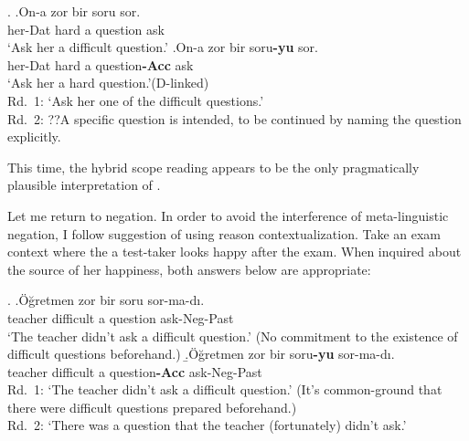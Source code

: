 \documentclass[11pt,a4paper]{article}
\begin{document}
\ex.
\ag.\label{impz}{On-a} {zor} {bir} {soru} {sor}.\\
{her-Dat} {hard} {a} {question} {ask}\\
`Ask her a difficult question.'
\bg.\label{impa}{On-a} {zor} {bir} {soru\bf{-yu}} {sor}.\\
{her-Dat} {hard} {a} {question\bf{-Acc}} {ask}\\
`Ask her a hard question.'\hfill (D-linked)\\
Rd.\ 1: `Ask her one of the difficult questions.'\\
Rd.\ 2: ??A specific question is intended, to be continued by naming the question
explicitly.

This time, the hybrid scope reading appears to be the only
pragmatically plausible interpretation of .


Let me return to negation. In order to avoid the interference of
meta-linguistic negation, I follow  suggestion of
using reason contextualization. Take an exam context where the
a test-taker looks happy after the exam. When inquired about the source of
her happiness, both answers below are appropriate:  

\ex.
\a.\label{sorunegz}Öğretmen zor bir soru sor-ma-dı.\\
teacher difficult a question ask-Neg-Past\\
`The teacher didn't ask a difficult question.' (No commitment to the
existence of difficult questions beforehand.)
\b.\label{sorunega}Öğretmen zor bir soru{\bf-yu} sor-ma-dı.\\
teacher difficult a question{\bf-Acc} ask-Neg-Past\\
Rd.\ 1: `The teacher didn't ask a difficult question.' (It's
common-ground that there were difficult questions prepared beforehand.)\\
Rd.\ 2: `There was a question that the teacher (fortunately) didn't ask.'
\end{document}
